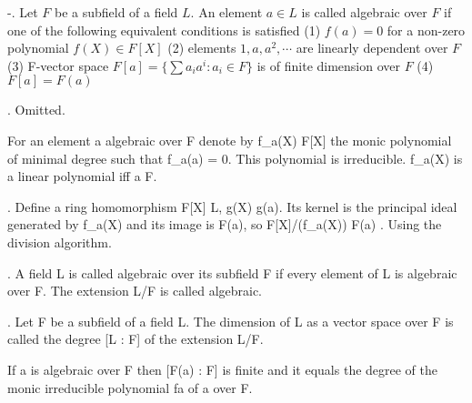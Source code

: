 
-\lemma. Let $F$ be a subfield of a field $L$. An element $a \in L$ is called 
algebraic over $F$ if one of the following equivalent conditions is satisfied 
  (1) $f(a) = 0$ for a non-zero polynomial $f(X) \in F[X]$
  (2) elements $1, a, a^2, \cdots$ are linearly dependent over $F$
  (3) F-vector space $F[a] = \{ \sum a_ia^i : a_i \in F \}$ is of finite dimension over $F$
  (4) $F[a] = F(a)$

\proof. Omitted.

  For an element a algebraic over F denote by
                                f_a(X) \in F[X]
the monic polynomial of minimal degree such that f_a(a) = 0. 
  This polynomial is irreducible. f_a(X) is a linear polynomial iff a \in F.

\lemma. Define a ring homomorphism F[X] \rarr L, g(X) \rarr g(a). Its kernel is the
  principal ideal generated by f_a(X) and its image is F(a), so
                              F[X]/(f_a(X)) \cong F(a)
\proof. Using the division algorithm.
                            
. A field L is called algebraic over its subfield F if every element of L is
algebraic over F. The extension L/F is called algebraic. 

. Let F be a subfield of a field L. The dimension of L as a vector space
over F is called the degree [L : F] of the extension L/F.

  If a is algebraic over F then [F(a) : F] is finite and it equals the degree of the
monic irreducible polynomial fa of a over F.

